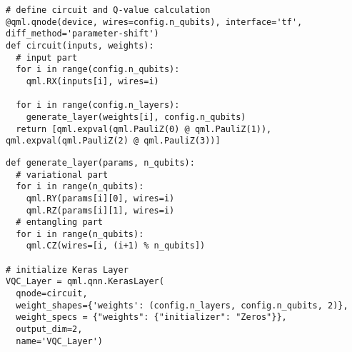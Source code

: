 \newsavebox\pennyla\newsavebox\pennylb
\begin{lrbox}{\pennyla}
\begin{minipage}{(\boxwidth-\hsep)/2}\lsttopcorr
\begin{lstlisting}
# define circuit and Q-value calculation
@qml.qnode(device, wires=config.n_qubits), interface='tf', diff_method='parameter-shift')
def circuit(inputs, weights):
  # input part
  for i in range(config.n_qubits):
    qml.RX(inputs[i], wires=i)

  for i in range(config.n_layers):
    generate_layer(weights[i], config.n_qubits)
  return [qml.expval(qml.PauliZ(0) @ qml.PauliZ(1)), qml.expval(qml.PauliZ(2) @ qml.PauliZ(3))]
\end{lstlisting}\vspace*{-1em}\end{minipage}
\end{lrbox}
\begin{lrbox}{\pennylb}
\begin{minipage}{(\boxwidth-\hsep)/2}\lsttopcorr
\begin{lstlisting}
def generate_layer(params, n_qubits): 
  # variational part
  for i in range(n_qubits):
    qml.RY(params[i][0], wires=i)
    qml.RZ(params[i][1], wires=i)
  # entangling part
  for i in range(n_qubits):
    qml.CZ(wires=[i, (i+1) % n_qubits])

# initialize Keras Layer
VQC_Layer = qml.qnn.KerasLayer(
  qnode=circuit,
  weight_shapes={'weights': (config.n_layers, config.n_qubits, 2)},
  weight_specs = {"weights": {"initializer": "Zeros"}},
  output_dim=2,
  name='VQC_Layer')
\end{lstlisting}\vspace*{-1em}\end{minipage}
\end{lrbox}


